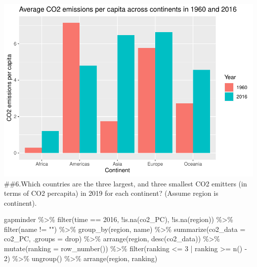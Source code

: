 \documentclass[
]{article}
\newenvironment{Shaded}{\begin{snugshade}}{\end{snugshade}}
\newcommand{\AttributeTok}[1]{\textcolor[rgb]{0.77,0.63,0.00}{#1}}
\newcommand{\DecValTok}[1]{\textcolor[rgb]{0.00,0.00,0.81}{#1}}
\newcommand{\FunctionTok}[1]{\textcolor[rgb]{0.00,0.00,0.00}{#1}}
\newcommand{\NormalTok}[1]{#1}
\newcommand{\SpecialCharTok}[1]{\textcolor[rgb]{0.00,0.00,0.00}{#1}}
\newcommand{\StringTok}[1]{\textcolor[rgb]{0.31,0.60,0.02}{#1}}
\begin{document}
\includegraphics{ps05-rmarkdown_files/figure-latex/unnamed-chunk-12-1.pdf}
\#\#6.Which countries are the three largest, and three smallest CO2
emitters (in terms of CO2 percapita) in 2019 for each continent? (Assume
region is continent).

\begin{Shaded}
\begin{Highlighting}[]
\NormalTok{gapminder }\SpecialCharTok{\%\textgreater{}\%}
  \FunctionTok{filter}\NormalTok{(time }\SpecialCharTok{==} \DecValTok{2016}\NormalTok{, }\SpecialCharTok{!}\FunctionTok{is.na}\NormalTok{(co2\_PC), }\SpecialCharTok{!}\FunctionTok{is.na}\NormalTok{(region)) }\SpecialCharTok{\%\textgreater{}\%}
  \FunctionTok{filter}\NormalTok{(name }\SpecialCharTok{!=} \StringTok{""}\NormalTok{) }\SpecialCharTok{\%\textgreater{}\%} 
  \FunctionTok{group\_by}\NormalTok{(region, name) }\SpecialCharTok{\%\textgreater{}\%}
  \FunctionTok{summarize}\NormalTok{(}\AttributeTok{co2\_data =}\NormalTok{ co2\_PC, }\AttributeTok{.groups =} \StringTok{\textquotesingle{}drop\textquotesingle{}}\NormalTok{) }\SpecialCharTok{\%\textgreater{}\%}
  \FunctionTok{arrange}\NormalTok{(region, }\FunctionTok{desc}\NormalTok{(co2\_data)) }\SpecialCharTok{\%\textgreater{}\%}
  \FunctionTok{mutate}\NormalTok{(}\AttributeTok{ranking =} \FunctionTok{row\_number}\NormalTok{()) }\SpecialCharTok{\%\textgreater{}\%}
  \FunctionTok{filter}\NormalTok{(ranking }\SpecialCharTok{\textless{}=} \DecValTok{3} \SpecialCharTok{|}\NormalTok{ ranking }\SpecialCharTok{\textgreater{}=} \FunctionTok{n}\NormalTok{() }\SpecialCharTok{{-}} \DecValTok{2}\NormalTok{) }\SpecialCharTok{\%\textgreater{}\%}
  \FunctionTok{ungroup}\NormalTok{() }\SpecialCharTok{\%\textgreater{}\%}
  \FunctionTok{arrange}\NormalTok{(region, ranking)}
\end{Highlighting}
\end{Shaded}
\end{document}

